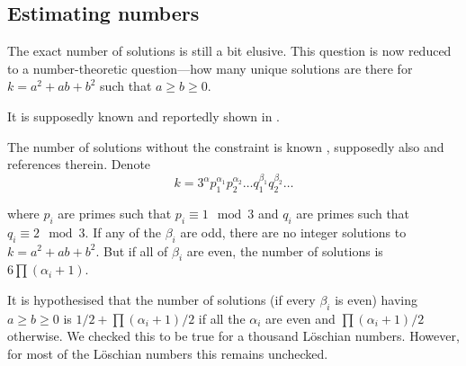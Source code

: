 \subsection{Estimating numbers}
	The exact number of solutions is still a bit elusive. This question is now reduced to a number-theoretic question---how many unique solutions are there for $k=a^2+ab+b^2$ such that $a\geq b\geq 0$.
	
	It is supposedly known \cite{oeisA003136} and reportedly shown in \cite{berndt1992fitzroy}.

	The number of solutions without the constraint is known \cite{marmon2005hexagonal}, supposedly also \cite{hirschhorn2008fitzroy} and references therein. Denote
	\begin{equation}
		k=3^\alpha p_1^{\alpha_1}p_2^{\alpha_2}\ldots q_1^{\beta_1}q_2^{\beta_2}\ldots
	\end{equation}
	
	where $p_i$ are primes such that $p_i \equiv 1 \mod 3$ and $q_i$ are primes such that $q_i \equiv 2 \mod 3$. If any of the $\beta_i$ are odd, there are no integer solutions to $k=a^2+ab+b^2$. But if all of $\beta_i$ are even, the number of solutions is $6\prod (\alpha_i +1)$.
	
	It is hypothesised \cite{nair2004elementary} that the number of solutions (if every $\beta_i$ is even) having $a \geq b \geq 0$ is $1/2 + \prod (\alpha_i +1)/2$ if all the $\alpha_i$ are even and $\prod (\alpha_i +1)/2$ otherwise. We checked this to be true for a thousand Löschian numbers. However, for most of the Löschian numbers this remains unchecked.
